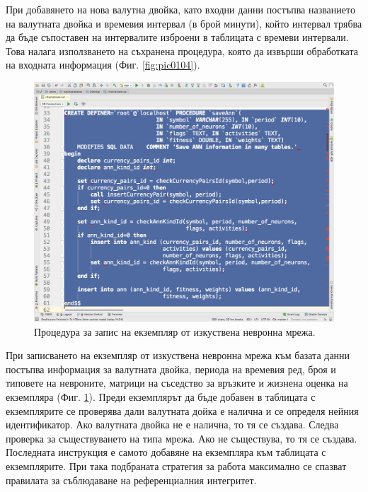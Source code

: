 \documentclass[book,14pt,oneside,openany]{memoir}
\begin{document}
При добавянето на нова валутна двойка, като входни данни постъпва названието на валутната двойка и времевия интервал (в брой минути), който интервал трябва да бъде съпоставен на интервалите изброени в таблицата с времеви интервали. Това налага използването на съхранена процедура, която да извърши обработката на входната информация (Фиг. \ref{fig:pic0104}). 

\begin{figure}[h]
  \centering
  \includegraphics[height=0.45\pdfpageheight]{pic0105}
  \caption{Процедура за запис на екземпляр от изкуствена невронна мрежа.}
\label{fig:pic0105}
\end{figure}
\FloatBarrier

При записването на екземпляр от изкуствена невронна мрежа към базата данни постъпва информация за валутната двойка, периода на времевия ред, броя и типовете на невроните, матрици на съседство за връзките и жизнена оценка на екземпляра (Фиг. \ref{fig:pic0105}). Преди екземплярът да бъде добавен в таблицата с екземплярите се проверява дали валутната дойка е налична и се определя нейния идентификатор. Ако валутната двойка не е налична, то тя се създава. Следва проверка за съществуването на типа мрежа. Ако не съществува, то тя се създава. Последната инструкция е самото добавяне на екземпляра към таблицата с екземплярите. При така подбраната стратегия за работа максимално се спазват правилата за съблюдаване на референциалния интегритет. 
\end{document}
